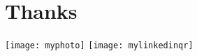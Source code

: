 \chapter*{Thanks}


\begin{center}
\texttt{[image: myphoto]}
\texttt{[image: mylinkedinqr]}
\end{center}	  

